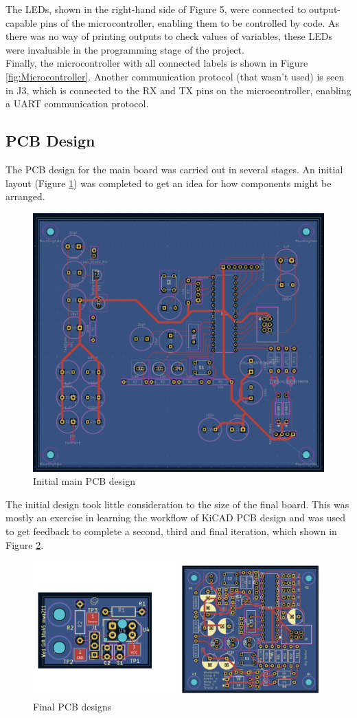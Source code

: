 \documentclass{article}
\begin{document}
The LEDs, shown in the right-hand side of Figure 5, were connected to output-capable pins of the microcontroller, enabling them to be controlled by code. As there was no way of printing outputs to check values of variables, these LEDs were invaluable in the programming stage of the project. 
\\

Finally, the microcontroller with all connected labels is shown in Figure \ref{fig:Microcontroller}. Another communication protocol (that wasn’t used) is seen in J3, which is connected to the RX and TX pins on the microcontroller, enabling a UART communication protocol.  
 
\subsection{PCB Design}
The PCB design for the main board was carried out in several stages. An initial layout (Figure \ref{fig:initpcb}) was completed to get an idea for how components might be arranged. 

\begin{figure}[H]
    \centering
    \includegraphics[width=0.4\linewidth]{REPORT/initpcb.png}
    \caption{Initial main PCB design}
    \label{fig:initpcb}
\end{figure}

The initial design took little consideration to the size of the final board. This was mostly an exercise in learning the workflow of KiCAD PCB design and was used to get feedback to complete a second, third and final iteration, which shown in Figure \ref{fig:finalpcb}. 

\begin{figure}[H]
    \centering
    \includegraphics[width=0.7\linewidth]{REPORT/Screenshot 2024-10-20 at 2.37.22 PM.png}
    \caption{Final PCB designs}
    \label{fig:finalpcb}
\end{figure}
\end{document}
